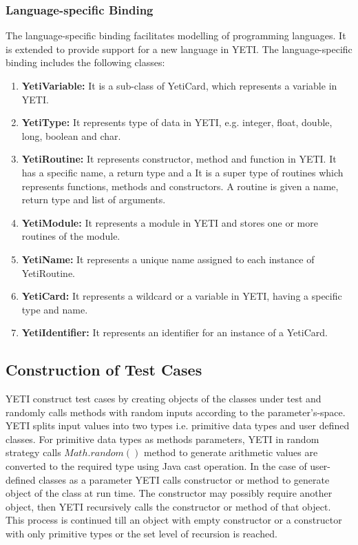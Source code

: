 \subsubsection{Language-specific Binding}
The language-specific binding facilitates modelling of programming languages. It is extended to provide support for a new language in YETI. The language-specific binding includes the following classes:
\begin{enumerate}
\item {\textbf{YetiVariable:}} It is a sub-class of YetiCard, which represents a variable in YETI.
\item {\textbf{YetiType:}} It represents type of data in YETI, e.g. integer, float, double, long, boolean and char.
\item {\textbf{YetiRoutine:}} It represents constructor, method and function in YETI. It has a specific name, a return type and a   It is a super type of routines which represents functions, methods and constructors. A routine is given a name, return type and list of arguments.
\item {\textbf{YetiModule:}} It represents a module in YETI and stores one or more routines of the module.
\item {\textbf{YetiName:}} It represents a unique name assigned to each instance of YetiRoutine.
\item {\textbf{YetiCard:}} It represents a wildcard or a variable in YETI, having a specific type and name.
\item {\textbf{YetiIdentifier:}} It represents an identifier for an instance of a YetiCard.
\end{enumerate}

\subsection{Construction of Test Cases}
YETI construct test cases by creating objects of the classes under test and randomly calls methods with random inputs according to the parameter's-space. YETI splits input values into two types i.e. primitive data types and user defined classes. For primitive data types as methods parameters, YETI in random strategy calls $Math.random()$ method to generate arithmetic values are converted to the required type using Java cast operation. In the case of user-defined classes as a parameter YETI calls constructor or method to generate object of the class at run time. The constructor may possibly require another object, then YETI recursively calls the constructor or method of that object. This process is continued till an object with empty constructor or a constructor with only primitive types or the set level of recursion is reached.

